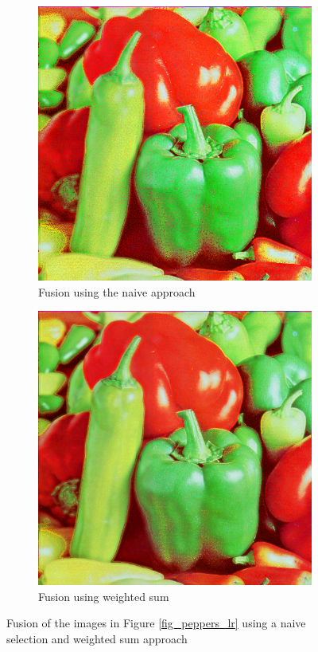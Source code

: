 \documentclass{article}
\begin{document}
\begin{figure}[h]
	\centering
	\begin{subfigure}[b]{0.45\textwidth}
		\centering
		\includegraphics[width=\textwidth]{figures/peppers/peppers_fused_naive}
		\caption{Fusion using the naive approach}
		\label{fig_naive_fusion}
	\end{subfigure}
	\begin{subfigure}[b]{0.45\textwidth}
		\centering
		\includegraphics[width=\textwidth]{figures/peppers/peppers_fused}
		\caption{Fusion using weighted sum}
		\label{fig_weighted_fusion}
	\end{subfigure}
	\caption{Fusion of the images in Figure \ref{fig_peppers_lr} using a naive selection and weighted sum approach}
\end{figure}
\end{document}
